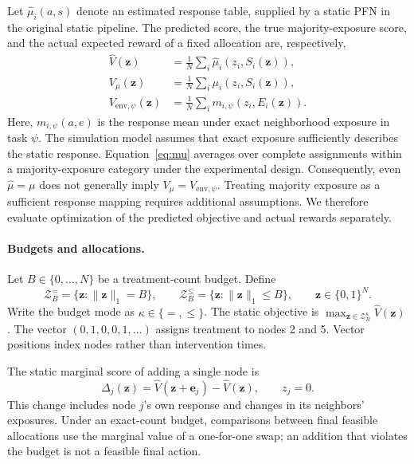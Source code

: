 \documentclass[a4paper,11pt]{article}
\numberwithin{equation}{section}
\begin{document}
Let $\widehat\mu_i(a,s)$ denote an estimated response table, supplied by a static PFN in the original static pipeline. The predicted score, the true majority-exposure score, and the actual expected reward of a fixed allocation are, respectively,
\begin{align}
\widehat V(\mathbf z)&=\frac1N\sum_i\widehat\mu_i(z_i,S_i(\mathbf z)),\\
V_\mu(\mathbf z)&=\frac1N\sum_i\mu_i(z_i,S_i(\mathbf z)),\\
V_{\mathrm{env},\psi}(\mathbf z)&=\frac1N\sum_i m_{i,\psi}(z_i,E_i(\mathbf z)).
\label{eq:three-values}
\end{align}
Here, $m_{i,\psi}(a,e)$ is the response mean under exact neighborhood exposure in task $\psi$. The simulation model assumes that exact exposure sufficiently describes the static response. Equation~\eqref{eq:mu} averages over complete assignments within a majority-exposure category under the experimental design. Consequently, even $\widehat\mu=\mu$ does not generally imply $V_\mu=V_{\mathrm{env},\psi}$. Treating majority exposure as a sufficient response mapping requires additional assumptions. We therefore evaluate optimization of the predicted objective and actual rewards separately.

\paragraph{Budgets and allocations.}
Let $B\in\{0,\ldots,N\}$ be a treatment-count budget. Define
\begin{equation}
\mathcal Z_B^{=} =\{\mathbf z:\|\mathbf z\|_1=B\},\qquad
\mathcal Z_B^{\leq}=\{\mathbf z:\|\mathbf z\|_1\leq B\},\qquad
\mathbf z\in\{0,1\}^N.
\label{eq:budget}
\end{equation}
Write the budget mode as $\kappa\in\{=,\leq\}$. The static objective is
$\max_{\mathbf z\in\mathcal Z_B^\kappa}\widehat V(\mathbf z)$.
The vector $(0,1,0,0,1,\ldots)$ assigns treatment to nodes 2 and 5. Vector positions index nodes rather than intervention times.

The static marginal score of adding a single node is
\begin{equation}
\Delta_j(\mathbf z)=\widehat V(\mathbf z+\mathbf e_j)-\widehat V(\mathbf z),\qquad z_j=0.
\label{eq:static-marginal}
\end{equation}
This change includes node $j$'s own response and changes in its neighbors' exposures. Under an exact-count budget, comparisons between final feasible allocations use the marginal value of a one-for-one swap; an addition that violates the budget is not a feasible final action.
\end{document}
